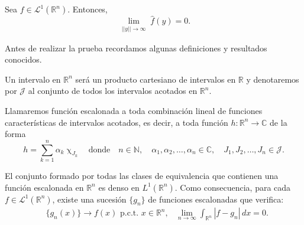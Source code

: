 \begin{teorema}\label{2.3} Sea $f \in \mathscr{L}^1(\mathbb{R}^n)$. Entonces,
\begin{equation}
     \underset{\substack{||y|| \rightarrow \infty}}{\lim}\widehat{f}(y)=0.
\end{equation}
\end{teorema}

\noindent Antes de realizar la prueba recordamos algunas definiciones y resultados conocidos.
\begin{definicion}
Un  intervalo en $\mathbb{R}^n$ será un producto cartesiano de intervalos en $\mathbb{R}$ y denotaremos por $\mathcal{J}$ al  conjunto de todos los intervalos acotados en $\mathbb{R}^n$.
\end{definicion}

\begin{definicion}\label{def:escalonada}
    Llamaremos función escalonada a toda combinación lineal de funciones características de
intervalos acotados, es decir, a toda función $h: \mathbb{R}^n \rightarrow \mathbb{C}$ de la forma
\begin{equation}
h = \sum_{k=1}^{n} \alpha_k \upchi_{J_k} \quad \text{donde} \quad n \in \mathbb{N}, \quad \alpha_1, \alpha_2, \ldots, \alpha_n \in \mathbb{C}, \quad J_1, J_2, \ldots, J_n \in \mathcal{J}.
\end{equation}

\end{definicion}

\begin{observacion}

El conjunto formado por todas las clases de equivalencia que contienen una función escalonada en $\mathbb{R}^n$ es denso en $L^1(\mathbb{R}^n)$. Como consecuencia, para cada $f \in \mathscr{L}^1(\mathbb{R}^n)$, existe una sucesión $\{g_n\}$ de funciones escalonadas que verifica:
\begin{align*}
&\{g_n(x)\} \rightarrow f(x) \text{ p.c.t. } x \in \mathbb{R}^n,
&\lim_{n \to \infty} \int_{\mathbb{R}^n} |f - g_n| \, dx = 0.
\end{align*}
\end{observacion}



